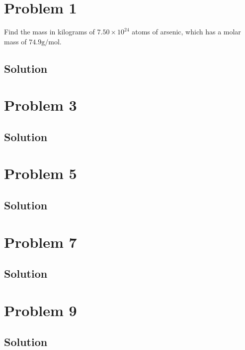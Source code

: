 \documentclass[12pt]{article}
\begin{document}

    \section{Problem 1}
        Find the mass in kilograms of $7.50 \times 10^{24}$ atoms of arsenic, which has a molar mass of $74.9 \unit{\gram/\mole}$.

        \subsection{Solution}

    \pagebreak
    \section{Problem 3}

        \subsection{Solution}

    \pagebreak
    \section{Problem 5}

        \subsection{Solution}

    \pagebreak
    \section{Problem 7}

        \subsection{Solution}

    \pagebreak
    \section{Problem 9}

        \subsection{Solution}
\end{document}
